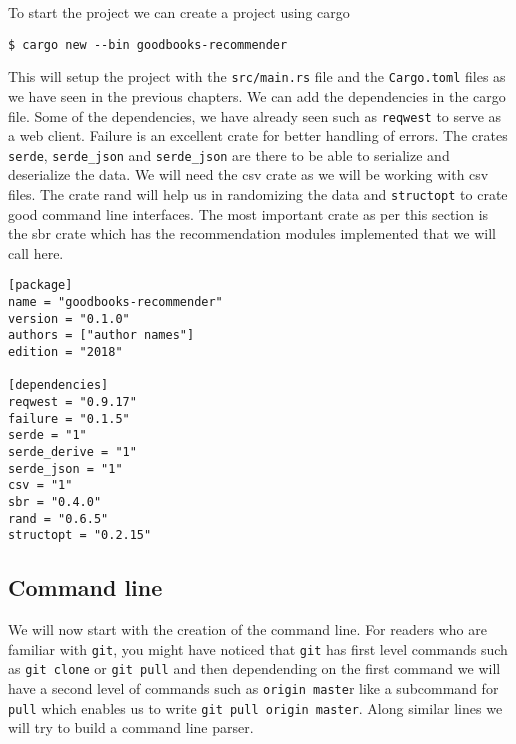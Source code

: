 \documentclass{book}
\begin{document}
To start the project we can create a project using cargo

\begin{lstlisting}[caption={}, basicstyle=\small]
$ cargo new --bin goodbooks-recommender
\end{lstlisting}

This will setup the project with the \lstinline{src/main.rs} file and the \lstinline{Cargo.toml} files as we have seen in the previous chapters. We can add the dependencies in the cargo file. Some of the dependencies, we have already seen such as \lstinline{reqwest} to serve as a web client. Failure is an excellent crate for better handling of errors. The crates \lstinline{serde}, \lstinline{serde_json} and \lstinline{serde_json} are there to be able to serialize and deserialize the data. We will need the csv crate as we will be working with csv files. The crate rand will help us in randomizing the data and \lstinline{structopt} to crate good command line interfaces. The most important crate as per this section is the sbr crate which has the recommendation modules implemented that we will call here.

\begin{lstlisting}[caption={chapter7/goodbooks-recommender/Cargo.toml}, basicstyle=\small]
[package]
name = "goodbooks-recommender"
version = "0.1.0"
authors = ["author names"]
edition = "2018"

[dependencies]
reqwest = "0.9.17"
failure = "0.1.5"
serde = "1"
serde_derive = "1"
serde_json = "1"
csv = "1"
sbr = "0.4.0"
rand = "0.6.5"
structopt = "0.2.15"
\end{lstlisting}

\subsection{Command line}%
We will now start with the creation of the command line. For readers who are familiar with \lstinline{git}, you might have noticed that \lstinline{git} has first level commands such as \lstinline{git clone} or \lstinline{git pull} and then dependending on the first command we will have a second level of commands such as \lstinline{origin maste}r like a subcommand for \lstinline{pull} which enables us to write \lstinline{git pull origin master}. Along similar lines we will try to build a command line parser.
\end{document}

